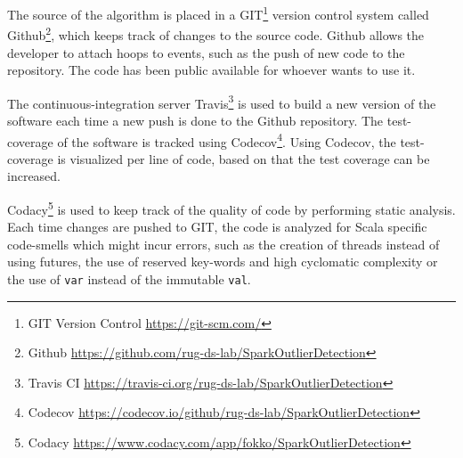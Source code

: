 The source of the algorithm is placed in a GIT\footnote{GIT Version Control \url{https://git-scm.com/}} version control system called Github\footnote{Github \url{https://github.com/rug-ds-lab/SparkOutlierDetection}}, which keeps track of changes to the source code. Github allows the developer to attach hoops to events, such as the push of new code to the repository. The code has been public available for whoever wants to use it.

The continuous-integration server Travis\footnote{Travis CI \url{https://travis-ci.org/rug-ds-lab/SparkOutlierDetection}} is used to build a new version of the software each time a new push is done to the Github repository. The test-coverage of the software is tracked using Codecov\footnote{Codecov \url{https://codecov.io/github/rug-ds-lab/SparkOutlierDetection}}. Using Codecov, the test-coverage is visualized per line of code, based on that the test coverage can be increased. 

Codacy\footnote{Codacy \url{https://www.codacy.com/app/fokko/SparkOutlierDetection}} is used to keep track of the quality of code by performing static analysis. Each time changes are pushed to GIT, the code is analyzed for Scala specific code-smells which might incur errors, such as the creation of threads instead of using futures, the use of reserved key-words and high cyclomatic complexity or the use of \texttt{var} instead of the immutable \texttt{val}. 
